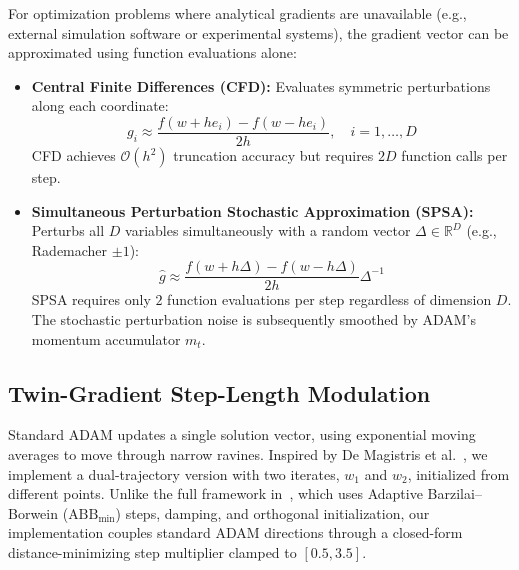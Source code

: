 \documentclass[11pt,a4paper]{article}
\newcommand{\added}[1]{#1}
\begin{document}
\added{For optimization problems where analytical gradients are unavailable (e.g., external simulation software or experimental systems), the gradient vector can be approximated using function evaluations alone:}
\added{\begin{itemize}
    \item \textbf{Central Finite Differences (CFD):} Evaluates symmetric perturbations along each coordinate:
    \begin{equation}
        g_i \approx \frac{f(w + h e_i) - f(w - h e_i)}{2h}, \quad i = 1, \dots, D
    \end{equation}
    CFD achieves $\mathcal{O}(h^2)$ truncation accuracy but requires $2D$ function calls per step.
    \item \textbf{Simultaneous Perturbation Stochastic Approximation (SPSA):} Perturbs all $D$ variables simultaneously with a random vector $\Delta \in \mathbb{R}^D$ (e.g., Rademacher $\pm 1$):
    \begin{equation}
        \hat{g} \approx \frac{f(w + h \Delta) - f(w - h \Delta)}{2h} \Delta^{-1}
    \end{equation}
    SPSA requires only $2$ function evaluations per step regardless of dimension $D$. The stochastic perturbation noise is subsequently smoothed by ADAM's momentum accumulator $m_t$.
\end{itemize}}

\added{\subsection{Twin-Gradient Step-Length Modulation}\label{sec:twin}}

\added{Standard ADAM updates a single solution vector, using exponential moving averages to move through narrow ravines. Inspired by De Magistris et al.~\cite{demagistris2026twin}, we implement a dual-trajectory version with two iterates, $w_1$ and $w_2$, initialized from different points. Unlike the full framework in~\cite{demagistris2026twin}, which uses Adaptive Barzilai--Borwein ($\text{ABB}_{\min}$) steps, damping, and orthogonal initialization, our implementation couples standard ADAM directions through a closed-form distance-minimizing step multiplier clamped to $[0.5, 3.5]$.}
\end{document}
